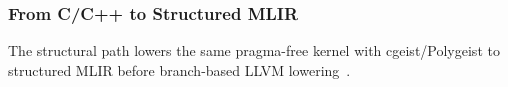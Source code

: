 


\subsubsection{From C/C++ to Structured MLIR}
\label{subsubsec:mlir}

The structural path lowers the same pragma-free kernel with cgeist/Polygeist to structured MLIR before branch-based LLVM lowering~\cite{lattner2021mlir,moses2021polygeist}. 

